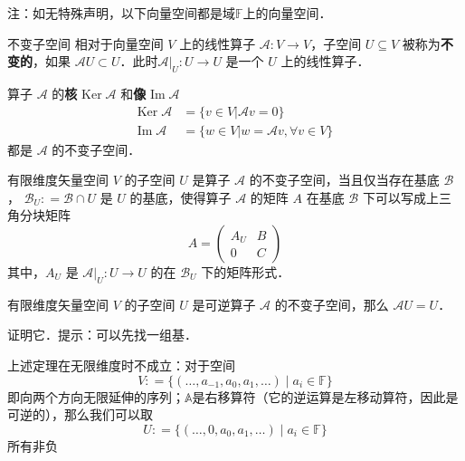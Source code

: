 

注：如无特殊声明，以下向量空间都是域$\mathbb{F}$上的向量空间．

\begin{definition}{不变子空间}
相对于向量空间 $V$ 上的线性算子 $\mathcal{A}: V \rightarrow V$，子空间 $U \subseteq V$ 被称为\textbf{不变的}，如果 $\mathcal{A} U \subset U$．此时$\mathcal{A}|_U: U \to U$ 是一个 $U$ 上的线性算子．
\end{definition}

\begin{example}{}
算子 $\mathcal{A}$ 的\textbf{核} $\mathrm{Ker}\;\mathcal A$ 和\textbf{像} $\mathrm{Im}\;\mathcal{A}$
\begin{equation}\label{InvSP_eq3}
\begin{aligned}
\mathrm{Ker}\;\mathcal{A}&=\{ v\in V|\mathcal{A} v= 0\}\\
\mathrm{Im}\;\mathcal{A}&=\{ w\in V| w=\mathcal{A} v,\forall v\in V\}
\end{aligned}
\end{equation}
都是 $\mathcal A$ 的不变子空间．
\end{example}

\begin{theorem}{}
有限维度矢量空间 $V$ 的子空间 $U$ 是算子 $\mathcal{A}$ 的不变子空间，当且仅当存在基底 $\mathcal{B}$， $\mathcal{B}_U: = \mathcal{B} \cap U$ 是 $U$ 的基底，使得算子 $\mathcal{A}$ 的矩阵 $A$ 在基底 $\mathcal{B}$ 下可以写成上三角分块矩阵
\begin{equation}
A = \begin{pmatrix}
A_U & B\\
0 & C
\end{pmatrix}
\end{equation}
其中，$A_U$ 是 $\mathcal{A}|_{U}: U \to U$ 的在 $\mathcal{B}_U$ 下的矩阵形式．
\end{theorem}

\begin{theorem}{}
有限维度矢量空间 $V$ 的子空间 $U$ 是可逆算子 $\mathcal{A}$ 的不变子空间，那么 $\mathcal{A} U = U$．
\end{theorem}
\begin{exercise}{}
证明它．提示：可以先找一组基．
\end{exercise}

\begin{example}{}
上述定理在无限维度时不成立：对于空间
$$
V: = \{ (\dots, a_{-1}, a_0, a_1, \dots) \mid a_i \in \mathbb{F}\}
$$
即向两个方向无限延伸的序列；$\mathbb{A}$是右移算符（它的逆运算是左移动算符，因此是可逆的），那么我们可以取
$$
U: = \{ (\dots, 0, a_0, a_1, \dots) \mid a_i \in \mathbb{F}\}
$$
所有非负

\end{example}

